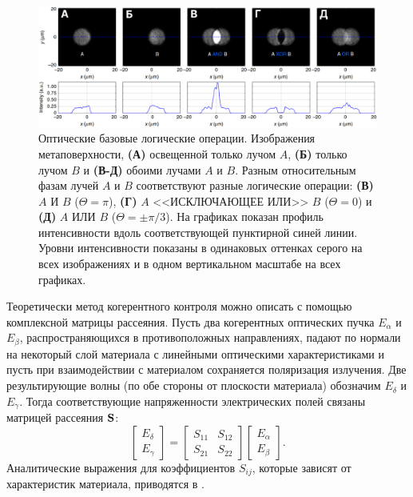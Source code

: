 \begin{figure}
    \begin{center}
        \includegraphics[width=\textwidth]{pictures/Optical_logic.png}
        \caption{Оптические базовые логические операции. Изображения метаповерхности, \textbf{(А)} освещенной только лучом $A$, \textbf{(Б)} только лучом $B$ и \textbf{(В-Д)} обоими лучами $A$ и $B$. Разным относительным фазам лучей $A$ и $B$ соответствуют разные логические операции: \textbf{(В)} $A$ И $B$ ($\Theta = \pi$), \textbf{(Г)} $A$ <<ИСКЛЮЧАЮЩЕЕ ИЛИ>> $B$ ($\Theta = 0$) и \textbf{(Д)} $A$ ИЛИ $B$ ($\Theta = \pm \pi/3$). На графиках показан профиль интенсивности вдоль соответствующей пунктирной синей линии. Уровни интенсивности показаны в одинаковых оттенках серого на всех изображениях и в одном вертикальном масштабе на всех графиках.\cite[Fig. 3]{twoDimensional2016}}
    \end{center}
    \label{fig:opticalLogic}
\end{figure}

Теоретически метод когерентного контроля можно описать с помощью комплексной матрицы рассеяния. Пусть два когерентных оптических пучка $E_\alpha$ и $E_\beta$, распространяющихся в противоположных направлениях, падают по нормали на некоторый слой материала с линейными оптическими характеристиками и пусть при взаимодействии с материалом сохраняется поляризация излучения. Две результирующие волны (по обе стороны от плоскости материала) обозначим $E_\delta$ и $E_\gamma$. Тогда соответствующие напряженности электрических полей связаны матрицей рассеяния $\mathbf{S}$:
\begin{equation}
    \begin{bmatrix}
        E_\delta \\
        E_\gamma
    \end{bmatrix} = \begin{bmatrix}
        S_{11} & S_{12} \\
        S_{21} & S_{22}
    \end{bmatrix} \begin{bmatrix}
        E_\alpha \\
        E_\beta
    \end{bmatrix}.  
    \label{scatteringMatrix}
\end{equation}
Аналитические выражения для коэффициентов $S_{ij}$, которые зависят от характеристик материала, приводятся в \cite{CPATheory2015}.

